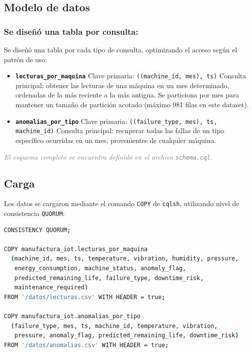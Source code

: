 \documentclass[12pt]{article}
\newcommand{\nota}[1]{\textit{\textcolor{gray}{#1}}}
\begin{document}
\subsection{Modelo de datos}
\subsubsection{Se diseñó una tabla por consulta:}
Se diseñó una tabla por cada tipo de consulta, optimizando el acceso según el patrón de uso:

\begin{itemize}\itemsep0.4em
  \item \textbf{\texttt{lecturas\_por\_maquina}}  
  Clave primaria: \texttt{((machine\_id, mes), ts)}  
  Consulta principal: obtener las lecturas de una máquina en un mes determinado, ordenadas de la más reciente a la más antigua.  
  Se particiona por mes para mantener un tamaño de partición acotado (máximo 981 filas en este dataset).

  \item \textbf{\texttt{anomalias\_por\_tipo}}  
  Clave primaria: \texttt{((failure\_type, mes), ts, machine\_id)}  
  Consulta principal: recuperar todas las fallas de un tipo específico ocurridas en un mes, provenientes de cualquier máquina.
\end{itemize}

\nota{El esquema completo se encuentra definido en el archivo \texttt{schema.cql}.}

\newpage
\subsection{Carga}
Los datos se cargaron mediante el comando \texttt{COPY} de \texttt{cqlsh}, utilizando nivel de consistencia \texttt{QUORUM}:

\begin{lstlisting}[language=bash,caption={Comandos de carga}]
CONSISTENCY QUORUM;

COPY manufactura_iot.lecturas_por_maquina 
  (machine_id, mes, ts, temperature, vibration, humidity, pressure, 
   energy_consumption, machine_status, anomaly_flag, 
   predicted_remaining_life, failure_type, downtime_risk, 
   maintenance_required) 
FROM '/datos/lecturas.csv' WITH HEADER = true;

COPY manufactura_iot.anomalias_por_tipo 
  (failure_type, mes, ts, machine_id, temperature, vibration, 
   pressure, anomaly_flag, predicted_remaining_life, downtime_risk) 
FROM '/datos/anomalias.csv' WITH HEADER = true;
\end{lstlisting}
\end{document}
